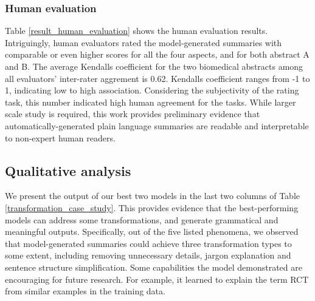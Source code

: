 \documentclass[letterpaper, table]{article} %
\begin{document}
\subsubsection{Human evaluation}
Table \ref{result_human_evaluation} shows the human evaluation results. Intriguingly, human evaluators rated the model-generated summaries with comparable or even higher scores for all the four aspects, and for both abstract A and B. The average Kendalls coefficient \cite{sen1968estimates} for the two biomedical abstracts among all evaluators' inter-rater aggrement is 0.62. Kendalls coefficient ranges from -1 to 1, indicating low to high association. Considering the subjectivity of the rating task, this number indicated high human agreement for the tasks.
While larger scale study is required,
this work provides preliminary evidence that automatically-generated plain language summaries
are readable and interpretable to non-expert human readers.
\subsection{Qualitative analysis}
We present the output of our best two models in the last two columns of Table \ref{transformation_case_study}.
This provides evidence that the best-performing models can address some transformations, and generate grammatical and meaningful outputs.
Specifically, out of the five listed phenomena, we observed that model-generated summaries could achieve three transformation types to some extent, including removing unnecessary details, jargon explanation and sentence structure simplification.
Some capabilities the model demonstrated are encouraging for future research.
For example, it learned to explain the term RCT from similar examples in the training data.
\end{document}
